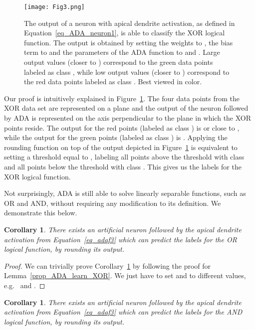 \documentclass[pdflatex,sn-mathphys]{sn-jnl}
\theoremstyle{thmstyleone}
\newtheorem{corollary}[thm]{Corollary}
\theoremstyle{thmstyletwo}\newtheorem{example}{Example}\newtheorem{remark}{Remark}
\theoremstyle{thmstylethree}\newtheorem{definition}{Definition}\DeclareMathOperator{\sinc}{sinc}
\begin{document}
\begin{figure}[!t]
\begin{center}
\centerline{\texttt{[image: Fig3.png]}}
\caption{The output of a neuron with apical dendrite activation, as defined in Equation~\eqref{eq_ADA_neuron1}, is able to classify the XOR logical function. The output is obtained by setting the weights to \usebox{\wmat}, the bias term to  and the parameters of the ADA function to  and . Large output values (closer to ) correspond to the green data points labeled as class , while low output values (closer to ) correspond to the red data points labeled as class . Best viewed in color.}
\label{fig_xor}
\end{center}
\end{figure}

Our proof is intuitively explained in Figure~\ref{fig_xor}. The four data points from the XOR data set are represented on a plane and the output of the neuron followed by ADA is represented on the axis perpendicular to the plane in which the XOR points reside. The output for the red points (labeled as class ) is  or close to , while the output for the green points (labeled as class ) is . Applying the rounding function  on top of the output depicted in Figure~\ref{fig_xor} is equivalent to setting a threshold equal to , labeling all points above the threshold with class  and all points below the threshold with class . This gives us the labels for the XOR logical function.

Not surprisingly, ADA is still able to solve linearly separable functions, such as OR and AND, without requiring any modification to its definition. We demonstrate this below.

\begin{corollary}\label{prop_ADA_learn_OR}
There exists an artificial neuron followed by the apical dendrite activation from Equation~\eqref{eq_adaf3} which can predict the labels for the OR logical function, by rounding its output.
\end{corollary}

\begin{proof}
We can trivially prove Corollary~\ref{prop_ADA_learn_OR} by following the proof for Lemma~\ref{prop_ADA_learn_XOR}. We just have to set  and  to different values, e.g.~ and .
\end{proof}
  

\begin{corollary}\label{prop_ADA_learn_AND}
There exists an artificial neuron followed by the apical dendrite activation from Equation~\eqref{eq_adaf3} which can predict the labels for the AND logical function, by rounding its output.
\end{corollary}
\end{document}

